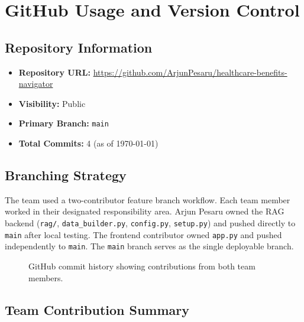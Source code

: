 \documentclass[12pt, letterpaper]{article}
\begin{document}
\section{GitHub Usage and Version Control}
\label{sec:github}

\subsection{Repository Information}
\begin{itemize}
  \item \textbf{Repository URL:} \url{https://github.com/ArjunPesaru/healthcare-benefits-navigator}
  \item \textbf{Visibility:} Public
  \item \textbf{Primary Branch:} \texttt{main}
  \item \textbf{Total Commits:} 4 (as of \today)
\end{itemize}

\subsection{Branching Strategy}

The team used a two-contributor feature branch workflow. Each team member worked in their designated responsibility area. Arjun Pesaru owned the RAG backend (\texttt{rag/}, \texttt{data\_builder.py}, \texttt{config.py}, \texttt{setup.py}) and pushed directly to \texttt{main} after local testing. The frontend contributor owned \texttt{app.py} and pushed independently to \texttt{main}. The \texttt{main} branch serves as the single deployable branch.

\begin{figure}[H]
  \centering
  \caption{GitHub commit history showing contributions from both team members.}
  \label{fig:git_network}
\end{figure}

\subsection{Team Contribution Summary}
\end{document}

